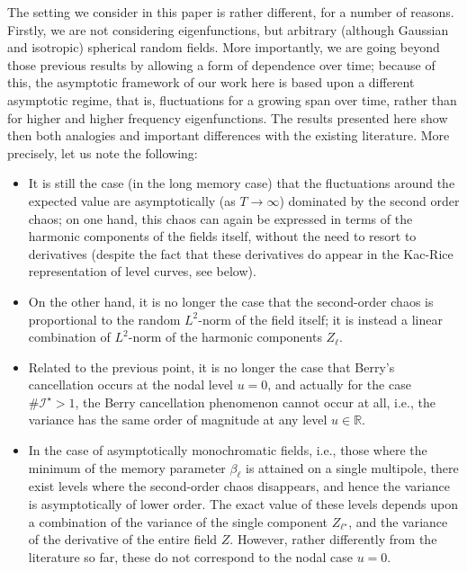 \documentclass[10pt]{amsart}
\theoremstyle{definition}\newtheorem{defi}[theo]{Definition}\newtheorem{rema}[theo]{Remark}\newtheorem{exam}[theo]{Example}\newtheorem{exem}[theo]{Example}\newtheorem{nota}[theo]{Notation}
\newcommand{\clI}{\mathcal{I}}
\newcommand{\bbR}{\mathbb{R}}
\begin{document}
The setting we consider in this paper is rather different, for a number of reasons. Firstly, we are not considering eigenfunctions, but arbitrary (although Gaussian and isotropic) spherical random fields. More importantly, we are going beyond those previous results by allowing a form of dependence over time; because of this, the asymptotic framework of our work here is based upon a different asymptotic regime, that is, fluctuations for a growing span over time, rather than for higher and higher frequency eigenfunctions. The results presented here show then both analogies and important differences with the existing literature. More precisely, let us note the following:
\begin{itemize}
\item It is still the case (in the long memory case) that the fluctuations around the expected value are asymptotically (as $T\rightarrow \infty $) dominated by the second order chaos; on one hand, this chaos can again be expressed in terms of the harmonic components of the fields itself, without the need to resort to derivatives (despite the fact that these derivatives do appear in the Kac-Rice representation of level curves, see below).

\item On the other hand, it is no longer the case that the second-order chaos is proportional to the random $L^{2}$-norm of the field itself; it is instead a linear combination of $L^{2}$-norm of the harmonic components $ Z_{\ell }$.

\item Related to the previous point, it is no longer the case that Berry's cancellation occurs at the nodal level $u=0$, and actually for the case $\#
\clI^\star>1$, the Berry cancellation phenomenon cannot occur at all, i.e., the variance has the same order of magnitude at any level $u\in\bbR$.

\item In the case of asymptotically monochromatic fields, i.e., those where the minimum of the memory parameter $\beta_\ell$ is attained on a single multipole, there exist levels where the second-order chaos disappears, and hence the variance is asymptotically of lower order. The exact value of these levels depends upon a combination of the variance of the single component $Z_{\ell^\star}$, and the variance of the derivative of the entire field $Z$. However, rather differently from the literature so far, these do not correspond to the nodal case $u=0$.
\end{itemize}
\end{document}
